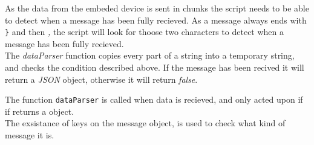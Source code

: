 As the data from the embeded device is sent in chunks the script needs to be able to detect when a message has been fully recieved. As a message always ends with \texttt{\}} and then \textit{,} the script will look for thoose two characters to detect when a message has been fully recieved.
\\
The \textit{dataParser} function copies every part of a string into a temporary string, and checks the condition described above. If the message has been recived it will return a \textit{JSON} object, otherwise it will return \textit{false}.

The function \texttt{dataParser} is called when data is recieved, and only acted upon if if returns a object.  
\\
The exsistance of keys on the message object, is used to check what kind of message it is.

